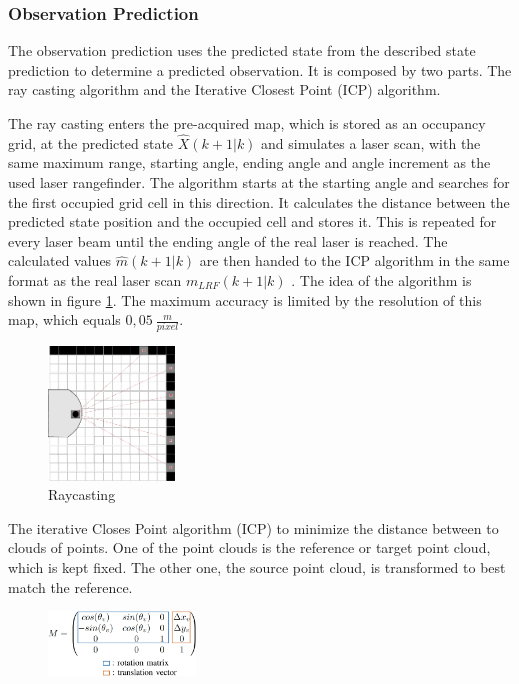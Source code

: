 \subsubsection{Observation Prediction}
\label{subsubsec:Observation_Prediction}
The observation prediction uses the predicted state from the described state prediction to determine a predicted observation.
It is composed by two parts. The ray casting algorithm and the Iterative Closest Point (ICP) algorithm.

The ray casting enters the pre-acquired map, which is stored as an occupancy grid, at the predicted state $\hat{X}(k+1|k)$ and simulates a laser scan, with the same maximum range, starting angle, ending angle and angle increment as the used laser rangefinder. The algorithm starts at the starting angle and searches for the first occupied grid cell in this direction. It calculates the distance between the predicted state position and the occupied cell and stores it. This is repeated for every laser beam until the ending angle of the real laser is reached. The calculated values $\hat{m}(k+1|k)$ are then handed to the ICP algorithm in the same format as the real laser scan $m_{LRF}(k+1|k)$ .
The idea of the algorithm is shown in figure \ref{fig:Raycasting}. The maximum accuracy is limited by the resolution of this map, which equals $0,05~\frac{m}{pixel}$.
\begin{figure}[h!]
\centering
\includegraphics[width=0.3\textwidth]{figures/raycast.pdf}
      \caption{Raycasting}
      \label{fig:Raycasting}
\end{figure}

The iterative Closes Point algorithm (ICP) to minimize the distance between to clouds of points. One of the point clouds is the reference or target point cloud, which is kept fixed. The other one, the source point cloud, is transformed to best match the reference.
\begin{figure}[h!]
\centering
\includegraphics[width=0.35\textwidth]{figures/M}
      \label{fig:transformation_matrix}
\end{figure}

